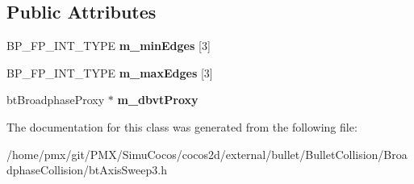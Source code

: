 \subsection*{Public Attributes}
\begin{DoxyCompactItemize}
\item 
\mbox{\label{classbtAxisSweep3Internal_1_1Handle_a69f234eb039e6dc7e6c324bb9e73f801}} 
B\+P\+\_\+\+F\+P\+\_\+\+I\+N\+T\+\_\+\+T\+Y\+PE {\bfseries m\+\_\+min\+Edges} \mbox{[}3\mbox{]}
\item 
\mbox{\label{classbtAxisSweep3Internal_1_1Handle_ac9771a2d62a5c0fc9c23e73af53b4dff}} 
B\+P\+\_\+\+F\+P\+\_\+\+I\+N\+T\+\_\+\+T\+Y\+PE {\bfseries m\+\_\+max\+Edges} \mbox{[}3\mbox{]}
\item 
\mbox{\label{classbtAxisSweep3Internal_1_1Handle_aa87fd28924324c799033b4f82aa0bd1d}} 
bt\+Broadphase\+Proxy $\ast$ {\bfseries m\+\_\+dbvt\+Proxy}
\end{DoxyCompactItemize}


The documentation for this class was generated from the following file\+:\begin{DoxyCompactItemize}
\item 
/home/pmx/git/\+P\+M\+X/\+Simu\+Cocos/cocos2d/external/bullet/\+Bullet\+Collision/\+Broadphase\+Collision/bt\+Axis\+Sweep3.\+h\end{DoxyCompactItemize}
